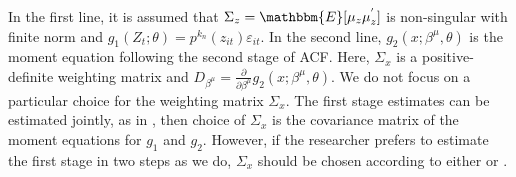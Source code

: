 \documentclass[12pt]{article}
\begin{document}
\begin{appendices}
In the first line, it is assumed that $\Sigma_{z}=\mathbbm{E}[\mu_{z}\mu_{z}^{'}]$ is non-singular with finite norm and $g_{1}(Z_{t};\theta)=p^{k_{n}}(z_{it})\varepsilon_{it}$. In the second line, $g_{2}(x; \beta^{\mu}, \theta)$ is the moment equation following the second stage of ACF. Here, $\Sigma_{x}$ is a positive-definite weighting matrix and $D_{\beta^{\mu}}=\frac{\partial}{\partial \beta^{\mu}}g_{2}(x; \beta^{\mu}, \theta)$. We do not focus on a particular choice for the weighting matrix $\Sigma_{x}$. The first stage estimates can be estimated jointly, as in \cite{Wooldridge2009}, then choice of $\Sigma_{x}$ is the covariance matrix of the moment equations for $g_{1}$ and $g_{2}$. However, if the researcher prefers to estimate the first stage in two steps as we do, $\Sigma_{x}$ should be chosen according to either \cite{Ai2012} or \cite{Ackerberg2014}.


\end{appendices}
\end{document}
